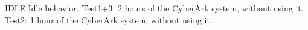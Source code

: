 IDLE
Idle behavior. 
Test1+3: 2 hours of the CyberArk system, without using it.
Test2: 1 hour of the CyberArk system, without using it.